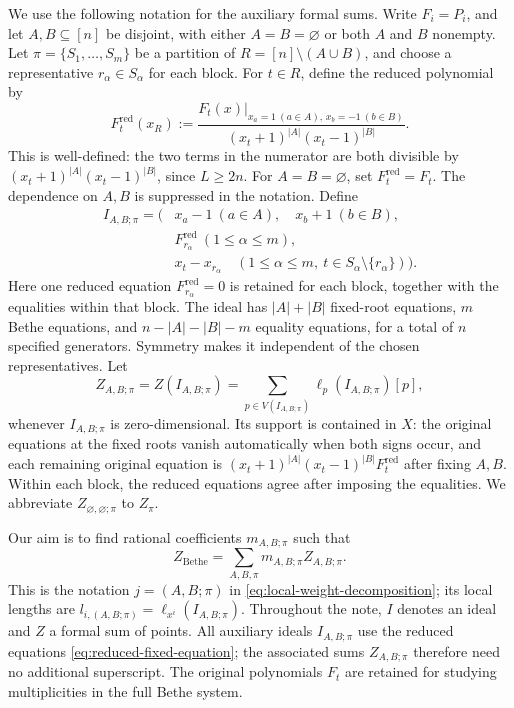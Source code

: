 \documentclass[11pt]{article}
\theoremstyle{definition}
\begin{document}
We use the following notation for the auxiliary formal sums. Write $F_i=P_i$,
and let $A,B\subseteq[n]$ be disjoint, with either $A=B=\varnothing$ or
both $A$ and $B$ nonempty. Let $\pi=\{S_1,\ldots,S_m\}$ be a partition
of $R=[n]\setminus(A\cup B)$, and choose a representative $r_\alpha\in
S_\alpha$ for each block. For $t\in R$, define
the reduced polynomial by
\begin{equation}\label{eq:reduced-fixed-equation}
 F_t^{\mathrm{red}}(x_R)
 :=\frac{\left.F_t(x)\right|_{x_a=1\ (a\in A),\,
                                      x_b=-1\ (b\in B)}}{(x_t+1)^{|A|}(x_t-1)^{|B|}}.
\end{equation}
This is well-defined: the two terms in the numerator are both divisible
by $(x_t+1)^{|A|}(x_t-1)^{|B|}$, since $L\ge2n$.
For $A=B=\varnothing$, set $F_t^{\mathrm{red}}=F_t$.
The dependence on $A,B$ is suppressed in the notation. Define
\begin{equation}\label{eq:fixed-partition-ideal}
 \begin{aligned}
 I_{A,B;\pi}=\bigl(&x_a-1\ (a\in A),\quad x_b+1\ (b\in B),\\
                 &F_{r_\alpha}^{\mathrm{red}}\ (1\le\alpha\le m),\\
                 &x_t-x_{r_\alpha}\quad
                  (1\le\alpha\le m,\ t\in S_\alpha\setminus\{r_\alpha\})
                  \bigr).
 \end{aligned}
\end{equation}
Here one reduced equation $F_{r_\alpha}^{\mathrm{red}}=0$ is retained for each block, together
with the equalities within that block. The ideal has $|A|+|B|$ fixed-root
equations, $m$ Bethe equations, and $n-|A|-|B|-m$ equality equations,
for a total of $n$ specified generators. Symmetry makes it independent
of the chosen representatives. Let
\[
 Z_{A,B;\pi}=Z(I_{A,B;\pi})
 =\sum_{p\in V(I_{A,B;\pi})}\ell_p(I_{A,B;\pi})[p],
\]
whenever $I_{A,B;\pi}$ is zero-dimensional. Its support is contained in
$X$: the original equations at the fixed roots vanish automatically when
both signs occur, and each remaining original equation is
$(x_t+1)^{|A|}(x_t-1)^{|B|}F_t^{\mathrm{red}}$ after fixing $A,B$. Within each block,
the reduced equations agree after imposing the equalities. We abbreviate
$Z_{\varnothing,\varnothing;\pi}$ to $Z_\pi$.

Our aim is to find rational coefficients $m_{A,B;\pi}$ such that
\[
 Z_{\text{Bethe}}=\sum_{A,B,\pi}m_{A,B;\pi}Z_{A,B;\pi}.
\]
This is the notation $j=(A,B;\pi)$ in
\eqref{eq:local-weight-decomposition}; its local lengths are
$l_{i,(A,B;\pi)}=\ell_{x^i}(I_{A,B;\pi})$.
Throughout the note, $I$ denotes an ideal and $Z$ a formal sum of points.
All auxiliary ideals $I_{A,B;\pi}$ use the reduced equations
\eqref{eq:reduced-fixed-equation}; the associated sums $Z_{A,B;\pi}$
therefore need no additional superscript. The original polynomials
$F_t$ are retained for studying multiplicities in the full Bethe system.
\end{document}
